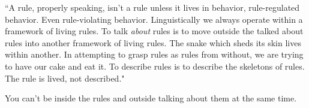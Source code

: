 ``A rule, properly speaking, isn't a rule unless it lives in behavior,
rule-regulated behavior. Even rule-violating behavior. Linguistically we always
operate within a framework of living rules. To talk \emph{about} rules is to
move outside the talked about rules into another framework of living rules. The
snake which sheds its skin lives within another. In attempting to grasp rules as
rules from without, we are trying to have our cake and eat it. To describe rules
is to describe the skeletons of rules. The rule is lived, not described." \cite{sellars1950language}

You can't be inside the rules and outside talking about them at the same time.
